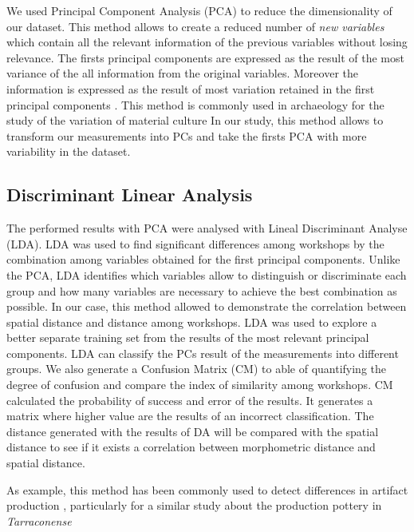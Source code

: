 \documentclass[review]{elsarticle}
\begin{document}
We used Principal Component Analysis (PCA) to reduce the dimensionality of our dataset. This method allows to create a reduced number of \textit{new variables} which contain all the relevant information of the previous variables without losing relevance. The firsts principal components are expressed as the result of the most variance of the all information from the original variables. Moreover the information is expressed as the result of most variation retained in the first principal components \citep{jolliffe_principal_2002, shennan_quantifying_1997}. 
This method is commonly used in archaeology for the study of the variation of material culture \citep{li_crossbows_2014, schillinger_differences_2016} 
In our study, this method allows to transform our measurements into PCs and take the firsts PCA with more variability in the dataset.  


\subsection{Discriminant Linear Analysis} 


The performed results with PCA were analysed with Lineal Discriminant Analyse (LDA). LDA was used to find significant differences among workshops by the combination among variables obtained for the first principal components. Unlike the PCA, LDA identifies which variables allow to distinguish or discriminate each group and how many variables are necessary to achieve the best combination as possible. In our case, this method allowed to demonstrate the correlation between spatial distance and distance among workshops. LDA was used to explore a better separate training set from the results of the most relevant principal components. LDA can classify the PCs result of the measurements into different groups.  We also generate a Confusion Matrix (CM) to able of quantifying the degree of confusion and compare the index of similarity among workshops.  CM calculated the probability of success and error of the results. It generates a matrix where higher value are the results of an incorrect classification. The distance generated with the results of DA will be compared with the spatial distance to see if it exists a correlation between morphometric distance and spatial distance. 

As example, this method has been commonly used to detect differences in  artifact production \citep{charlton_investigating_2012, thorpe_distribution_1984}, particularly for a similar study about the production pottery in \emph{Tarraconense} \citep{i_martin_alisis_1998}
\end{document}
